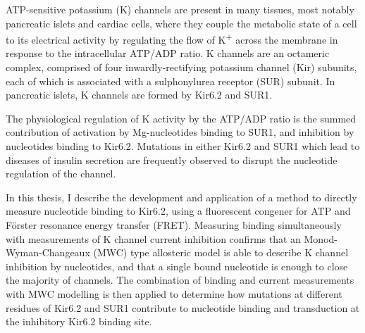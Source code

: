ATP-sensitive potassium (K\ATP{}) channels are present in many tissues, most notably pancreatic islets and cardiac cells, where they couple the metabolic state of a cell to its electrical activity by regulating the flow of K\textsuperscript{+} across the membrane in response to the intracellular ATP/ADP ratio.
K\ATP{} channels are an octameric complex, comprised of four inwardly-rectifying potassium channel (Kir) subunits, each of which is associated with a sulphonylurea receptor (SUR) subunit. 
In pancreatic islets, K\ATP{} channels are formed by Kir6.2 and SUR1.

The physiological regulation of K\ATP{} activity by the ATP/ADP ratio is the summed contribution of activation by Mg-nucleotides binding to SUR1, and inhibition by nucleotides binding to Kir6.2.
Mutations in either Kir6.2 and SUR1 which lead to diseases of insulin secretion are frequently observed to disrupt the nucleotide regulation of the channel.

In this thesis, I describe the development and application of a method to directly measure nucleotide binding to Kir6.2, using a fluorescent congener for ATP and F\"{o}rster resonance energy transfer (FRET).
Measuring binding simultaneously with measurements of K\ATP{} channel current inhibition confirms that an Monod-Wyman-Changeaux (MWC) type allosteric model is able to describe K\ATP{} channel inhibition by nucleotides, and that a single bound nucleotide is enough to close the majority of channels.
The combination of binding and current measurements with MWC modelling is then applied to determine how mutations at different residues of Kir6.2 and SUR1 contribute to nucleotide binding and transduction at the inhibitory Kir6.2 binding site.
